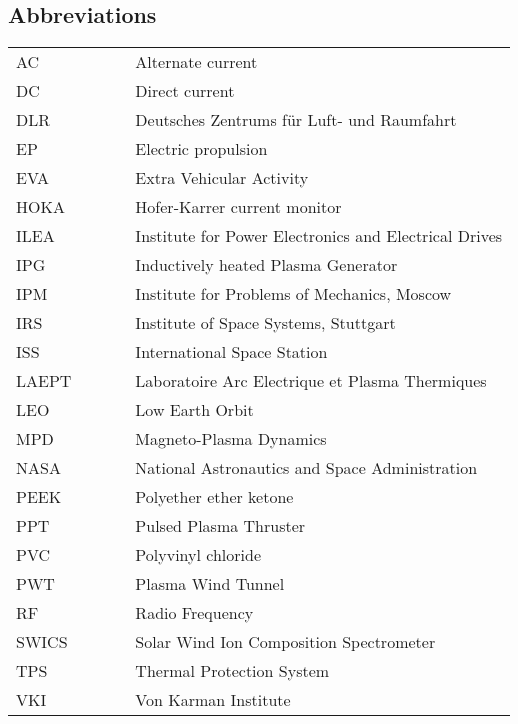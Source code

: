 \subsection*{Abbreviations}
\normalsize
\begin{supertabular}{p{20mm}p{2mm}p{5mm}p{3mm}l}\\

AC				&	&			&	&Alternate current\\
DC				&	&			&	&Direct current\\
DLR				&	&			&	&Deutsches Zentrums f\"ur Luft- und Raumfahrt\\
EP				&	&			&	&Electric propulsion\\
EVA				&	&			&	&Extra Vehicular Activity\\
HOKA			&	&			&	&Hofer-Karrer current monitor\\
ILEA				&	&			&	&Institute for Power Electronics and Electrical Drives\\
IPG				&	&			&	&Inductively heated Plasma Generator\\
IPM				&	&			&	&Institute for Problems of Mechanics, Moscow\\
IRS				&	&			&	&Institute of Space Systems, Stuttgart\\
ISS				&	&			&	&International Space Station\\
LAEPT			&	&			&	&Laboratoire Arc Electrique et Plasma Thermiques\\
LEO				&	&			&	&Low Earth Orbit\\
MPD				&	&			&	&Magneto-Plasma Dynamics\\
NASA			&	&			&	&National Astronautics and Space Administration\\
PEEK			&	&			&	&Polyether ether ketone\\
PPT				&	&			&	&Pulsed Plasma Thruster\\
PVC				&	&			&	&Polyvinyl chloride\\
PWT				&	&			&	&Plasma Wind Tunnel\\
RF				&	&			&	&Radio Frequency\\
SWICS			&	&			&	&Solar Wind Ion Composition Spectrometer\\
TPS				&	&			&	&Thermal Protection System\\
VKI				&	&			&	&Von Karman Institute\\

\end{supertabular}